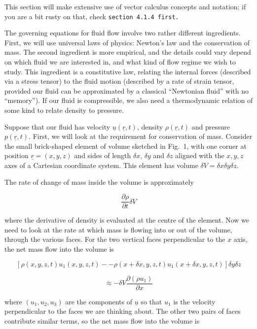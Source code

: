   This section will make extensive use of vector calculus concepts and 
  notation: if you are a bit rusty on that, check \tt{}section 4.1.4\rm{} 
  first. 

  The governing equations for fluid flow involve two rather different 
  ingredients. First, we will use universal laws of physics: Newton's law and 
  the conservation of mass. The second ingredient is more empirical, and the 
  details could vary depend on which fluid we are interested in, and what kind 
  of flow regime we wish to study. This ingredient is a constitutive law, 
  relating the internal forces (described via a stress tensor) to the fluid 
  motion (described by a rate of strain tensor, provided our fluid can be 
  approximated by a classical ``Newtonian fluid'' with no ``memory''). If our 
  fluid is compressible, we also need a thermodynamic relation of some kind to 
  relate density to pressure. 

  Suppose that our fluid has velocity $\underline{u}(\underline{r},t)$, density 
  $\rho(\underline{r},t)$ and pressure $p(\underline{r},t)$. First, we will 
  look at the requirement for conservation of mass. Consider the small 
  brick-shaped element of volume sketched in Fig.\ 1, with one corner at 
  position $\underline{r}=(x,y,z)$ and sides of length $\delta x$, $\delta y$ 
  and $\delta z$ aligned with the $x,y,z$ axes of a Cartesian coordinate 
  system. This element has volume $\delta V= \delta x \delta y \delta z$. 


  The rate of change of mass inside the volume is approximately 

  $$\dfrac{\partial \rho}{\partial t} \delta V \tag{1}$$ 

  where the derivative of density is evaluated at the centre of the element. 
  Now we need to look at the rate at which mass is flowing into or out of the 
  volume, through the various faces. For the two vertical faces perpendicular 
  to the $x$ axis, the net mass flow into the volume is 

  $$\left[\rho(x,y,z,t) u_1(x,y,z,t) -- \rho (x + \delta x,y,z,t) u_1(x + 
  \delta x,y,z,t) \right] \delta y \delta z $$ 

  $$\approx -\delta V \dfrac{\partial (\rho u_1)}{\partial x} \tag{2}$$ 

  where $(u_1,u_2,u_3)$ are the components of $\underline{u}$ so that $u_1$ is 
  the velocity perpendicular to the faces we are thinking about. The other two 
  pairs of faces contribute similar terms, so the net mass flow into the volume 
  is 

